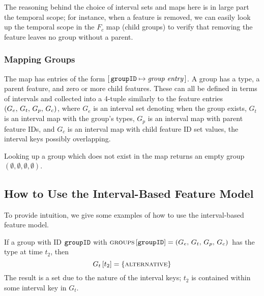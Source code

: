 The reasoning behind the choice of interval sets and maps here is in large part the temporal scope; for instance, when a feature is removed, we can easily look up the temporal scope in the $F_c$ map (child groups) to verify that removing the feature leaves no group without a parent.

\subsubsection{Mapping Groups}
\label{ssub:mapping-groups}

The \groups{} map has entries of the form $[ \,\texttt{groupID} \mapsto \textit{group entry}\, ]$. A group has a type, a parent feature, and zero or more child features. These can all be defined in terms of intervals and collected into a 4-tuple similarly to the feature entries $\left(G_e,\, G_t,\, G_p,\, G_c\right)$, where $G_e$ is an interval set denoting when the group exists, $G_t$ is an interval map with the group's types, $G_p$ is an interval map with parent feature IDs, and $G_c$ is an interval map with child feature ID set values, the interval keys possibly overlapping.

Looking up a group which does not exist in the map returns an empty group $(\emptyset \comma \emptyset \comma \emptyset \comma \emptyset)$. 

\subsection{How to Use the Interval-Based Feature Model}
\label{sub:how-to-use-the-interval-based-feature-model}
To provide intuition, we give some examples of how to use the interval-based feature model.

If a group with ID $\texttt{groupID}$ with $\textsc{groups}{} \left[ \texttt{groupID} \right] = \left(G_e,\, G_t,\, G_p,\, G_c\right){}$ has the type \xortype{} at time $t_2$, then
\[
  G_t \left[ t_2 \right] = \left\{\textsc{alternative}{}\right\}
\]
The result is a set due to the nature of the interval keys; $t_2$ is contained within some interval key in $G_t$. 


